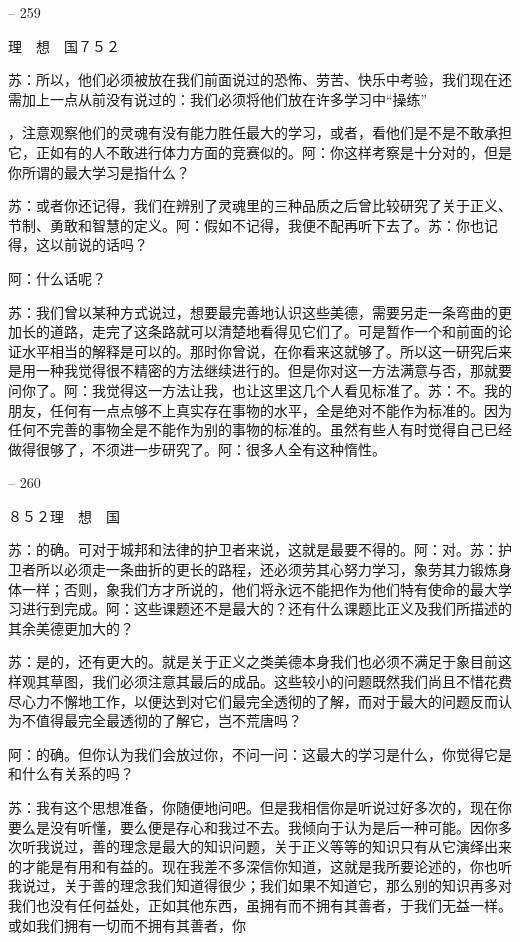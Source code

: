 \documentclass[11pt,oneside]{book}
\begin{document}
\begin{common-format}
    

-- 259

    理　想　国７５２

    苏：所以，他们必须被放在我们前面说过的恐怖、劳苦、快乐中考验，我们现在还需加上一点从前没有说过的：我们必须将他们放在许多学习中“操练”

    ，注意观察他们的灵魂有没有能力胜任最大的学习，或者，看他们是不是不敢承担它，正如有的人不敢进行体力方面的竞赛似的。阿：你这样考察是十分对的，但是你所谓的最大学习是指什么？

    苏：或者你还记得，我们在辨别了灵魂里的三种品质之后曾比较研究了关于正义、节制、勇敢和智慧的定义。阿：假如不记得，我便不配再听下去了。苏：你也记得，这以前说的话吗？

    阿：什么话呢？

    苏：我们曾以某种方式说过，想要最完善地认识这些美德，需要另走一条弯曲的更加长的道路，走完了这条路就可以清楚地看得见它们了。可是暂作一个和前面的论证水平相当的解释是可以的。那时你曾说，在你看来这就够了。所以这一研究后来是用一种我觉得很不精密的方法继续进行的。但是你对这一方法满意与否，那就要问你了。阿：我觉得这一方法让我，也让这里这几个人看见标准了。苏：不。我的朋友，任何有一点点够不上真实存在事物的水平，全是绝对不能作为标准的。因为任何不完善的事物全是不能作为别的事物的标准的。虽然有些人有时觉得自己已经做得很够了，不须进一步研究了。阿：很多人全有这种惰性。

    

-- 260

    ８５２理　想　国

    苏：的确。可对于城邦和法律的护卫者来说，这就是最要不得的。阿：对。苏：护卫者所以必须走一条曲折的更长的路程，还必须劳其心努力学习，象劳其力锻炼身体一样；否则，象我们方才所说的，他们将永远不能把作为他们特有使命的最大学习进行到完成。阿：这些课题还不是最大的？还有什么课题比正义及我们所描述的其余美德更加大的？

    苏：是的，还有更大的。就是关于正义之类美德本身我们也必须不满足于象目前这样观其草图，我们必须注意其最后的成品。这些较小的问题既然我们尚且不惜花费尽心力不懈地工作，以便达到对它们最完全透彻的了解，而对于最大的问题反而认为不值得最完全最透彻的了解它，岂不荒唐吗？

    阿：的确。但你认为我们会放过你，不问一问：这最大的学习是什么，你觉得它是和什么有关系的吗？

    苏：我有这个思想准备，你随便地问吧。但是我相信你是听说过好多次的，现在你要么是没有听懂，要么便是存心和我过不去。我倾向于认为是后一种可能。因你多次听我说过，善的理念是最大的知识问题，关于正义等等的知识只有从它演绎出来的才能是有用和有益的。现在我差不多深信你知道，这就是我所要论述的，你也听我说过，关于善的理念我们知道得很少；我们如果不知道它，那么别的知识再多对我们也没有任何益处，正如其他东西，虽拥有而不拥有其善者，于我们无益一样。或如我们拥有一切而不拥有其善者，你


\end{common-format}
\end{document}
